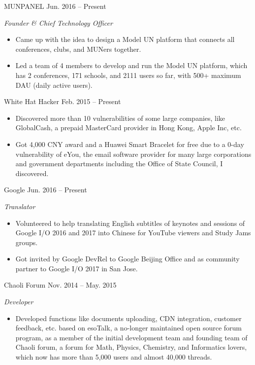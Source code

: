 \documentclass[]{adamyi-cv} %
\begin{document}
\begin{entrylist}


\entry
{MUNPANEL}
{Jun. 2016 -- Present}
{\emph{Founder \& Chief Technology Officer}
\begin{itemize}
\item Came up with the idea to design a Model UN platform that connects all conferences, clubs, and MUNers together.
\item Led a team of 4 members to develop and run the Model UN platform, which has 2 conferences, 171 schools, and 2111 users so far, with 500+ maximum DAU (daily active users).
\end{itemize}}


\entry
{White Hat Hacker}
{Feb. 2015 -- Present}
{\begin{itemize}
\item Discovered more than 10 vulnerabilities of some large companies, like GlobalCash, a prepaid MasterCard provider in Hong Kong, Apple Inc, etc.
\item Got 4,000 CNY award and a Huawei Smart Bracelet for free due to a 0-day vulnerability of eYou, the email software provider for many large corporations and government departments including the Office of State Council, I discovered.
\end{itemize}}


\entry
{Google}
{Jun. 2016 -- Present}
{\emph{Translator}
\begin{itemize}
\item Volunteered to help translating English subtitles of keynotes and sessions of Google I/O 2016 and 2017 into Chinese for YouTube viewers and Study Jams groups.
\item Got invited by Google DevRel to Google Beijing Office and as community partner to Google I/O 2017 in San Jose.
\end{itemize}}


\entry
{Chaoli Forum}
{Nov. 2014 -- May. 2015}
{\emph{Developer}
\begin{itemize}
\item Developed functions like documents uploading, CDN integration, customer feedback, etc. based on esoTalk, a no-longer maintained open source forum program, as a member of the initial development team and founding team of Chaoli forum, a forum for Math, Physics, Chemistry, and Informatics lovers, which now has more than 5,000 users and almost 40,000 threads.
\end{itemize}}


\end{entrylist}
\end{document}
